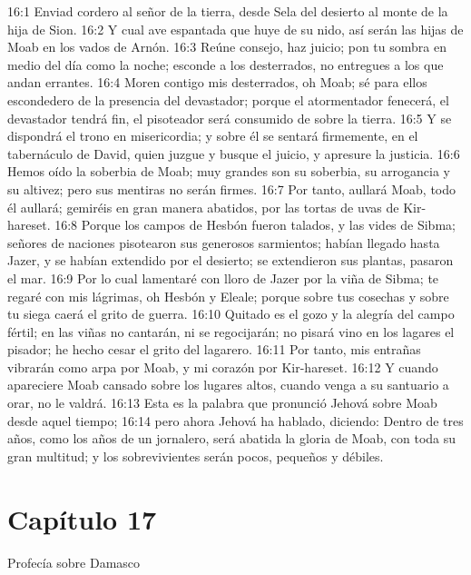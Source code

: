16:1 Enviad cordero al señor de la tierra, desde Sela del desierto al monte de la hija de Sion. 
16:2 Y cual ave espantada que huye de su nido, así serán las hijas de Moab en los vados de Arnón. 
16:3 Reúne consejo, haz juicio; pon tu sombra en medio del día como la noche; esconde a los desterrados, no entregues a los que andan errantes. 
16:4 Moren contigo mis desterrados, oh Moab; sé para ellos escondedero de la presencia del devastador; porque el atormentador fenecerá, el devastador tendrá fin, el pisoteador será consumido de sobre la tierra. 
16:5 Y se dispondrá el trono en misericordia; y sobre él se sentará firmemente, en el tabernáculo de David, quien juzgue y busque el juicio, y apresure la justicia. 
16:6 Hemos oído la soberbia de Moab; muy grandes son su soberbia, su arrogancia y su altivez; pero sus mentiras no serán firmes. 
16:7 Por tanto, aullará Moab, todo él aullará; gemiréis en gran manera abatidos, por las tortas de uvas de Kir-hareset. 
16:8 Porque los campos de Hesbón fueron talados, y las vides de Sibma; señores de naciones pisotearon sus generosos sarmientos; habían llegado hasta Jazer, y se habían extendido por el desierto; se extendieron sus plantas, pasaron el mar. 
16:9 Por lo cual lamentaré con lloro de Jazer por la viña de Sibma; te regaré con mis lágrimas, oh Hesbón y Eleale; porque sobre tus cosechas y sobre tu siega caerá el grito de guerra. 
16:10 Quitado es el gozo y la alegría del campo fértil; en las viñas no cantarán, ni se regocijarán; no pisará vino en los lagares el pisador; he hecho cesar el grito del lagarero. 
16:11 Por tanto, mis entrañas vibrarán como arpa por Moab, y mi corazón por Kir-hareset. 
16:12 Y cuando apareciere Moab cansado sobre los lugares altos, cuando venga a su santuario a orar, no le valdrá. 
16:13 Esta es la palabra que pronunció Jehová sobre Moab desde aquel tiempo; 
16:14 pero ahora Jehová ha hablado, diciendo: Dentro de tres años, como los años de un jornalero, será abatida la gloria de Moab, con toda su gran multitud; y los sobrevivientes serán pocos, pequeños y débiles. 
\section*{Capítulo 17 }
Profecía sobre Damasco 
 
